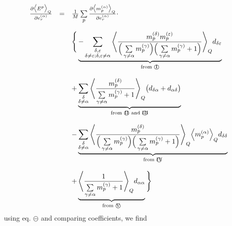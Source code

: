 \documentclass[a4paper,11pt]{article}
\begin{document}
\begin{equation}
	\begin{array}{lll}
	\frac{\partial \big<E^p\big>_Q}{\partial e_r^{(\alpha)}}
	& = & \frac{1}{M} \sum\limits_p \frac{\partial \big< m_p^{(\alpha)}
		\big>_Q}{\partial e_r^{(\alpha)}} \cdot \\\\
	&& \Bigg\{ \underbrace{-\sum\limits_{\substack{ \delta, \varepsilon \\
				\delta \neq \varepsilon; 
				\delta, \varepsilon \neq \alpha}}
		\Bigg< \frac{m_p^{(\delta)} m_p^{(\varepsilon)}}{
		\Big(\sum\limits_{\gamma \neq \alpha} m_p^{(\gamma)} \Big)
		\Big(\sum\limits_{\gamma \neq \alpha} m_p^{(\gamma)} + 1 \Big)}
		\Bigg>_Q d_{\delta\varepsilon}}_{
			\text{from \textcircled{I}}} \\\\
	&& + \underbrace{ \sum\limits_{\substack{\delta \\ \delta \neq \alpha}}
		\Bigg< \frac{m_p^{(\delta)}}{\sum\limits_{\gamma \neq \alpha}
			m_p^{(\gamma)} + 1}
		\Bigg>_Q \big( d_{\delta\alpha} + d_{\alpha\delta} \big)}_{
			\text{from \textcircled{II} and \textcircled{III}}} \\\\
	&& - \underbrace{ \sum\limits_{\substack{\delta \\ \delta \neq \alpha}}
		\Bigg< \frac{m_p^{(\delta)}}{
		\Big(\sum\limits_{\gamma \neq \alpha} m_p^{(\gamma)} \Big)
		\Big(\sum\limits_{\gamma \neq \alpha} m_p^{(\gamma)} + 1 \Big)}
		\Bigg>_Q \Big< m_p^{(\alpha)} \Big>_Q d_{\delta\delta} }_{
			\text{from \textcircled{IV}}} \\\\
	&& + \underbrace{ \Bigg< \frac{1}{\sum\limits_{\gamma \neq \alpha} 
				m_p^{(\gamma)} + 1} \Bigg>_Q d_{\alpha\alpha}}_{
					\text{from \textcircled{V}}}
	\Bigg\}
	\end{array}
\end{equation}
using eq. $\circleddash$ and comparing coefficients, we find
\end{document}
